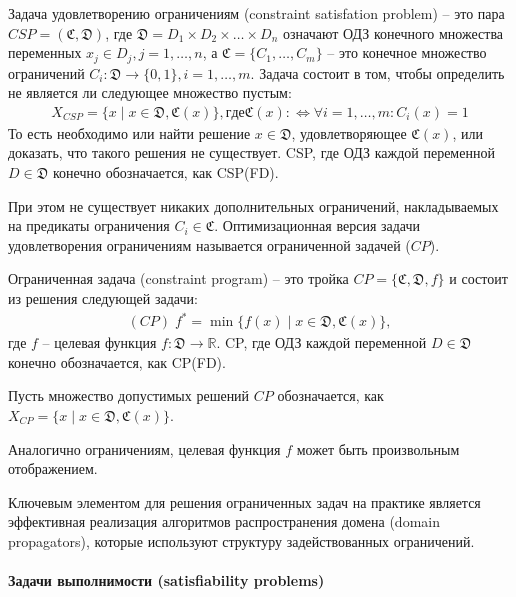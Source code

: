 \documentclass[%
	11pt,
	a4paper,
	utf8,
		]{article}
\begin{document}
\begin{definition}
	Задача удовлетворению ограничениям (constraint satisfation problem) -- это пара $CSP = (\mathfrak{C}, \mathfrak{D})$, где $\mathfrak{D}=D_1\times D_2\times\ldots\times D_n$ означают ОДЗ конечного множества переменных $x_j\in D_j, j=1,\ldots,n$, а $\mathfrak{C}=\{C_1, \ldots, C_m\}$ -- это конечное множество ограничений $C_i:  \mathfrak{D}\rightarrow\{0, 1\}, i=1,\ldots,m$. Задача состоит в том, чтобы определить не является ли следующее множество пустым: 
	\begin{align*}
		X_{CSP}=\{x\mid x\in \mathfrak{D}, \mathfrak{C}(x)\}, где \mathfrak{C}(x):\Leftrightarrow\forall i = 1, \ldots, m: C_i(x) = 1
	\end{align*}
	То есть необходимо или найти решение $x\in \mathfrak{D}$, удовлетворяющее $\mathfrak{C}(x)$, или доказать, что такого решения не существует. CSP, где ОДЗ каждой переменной $D\in\mathfrak{D}$ конечно обозначается, как CSP(FD).
\end{definition}

При этом не существует никаких дополнительных ограничений, накладываемых на предикаты ограничения $C_i\in\mathfrak{C}$. Оптимизационная версия задачи удовлетворения ограничениям называется ограниченной задачей ($CP$).

\begin{definition}
	Ограниченная задача (constraint program) -- это тройка $CP=\{\mathfrak{C}, \mathfrak{D}, f\}$ и состоит из решения следующей задачи:
	\begin{align*}
		(CP)\;f^{*} =\min \{f(x)\mid x\in \mathfrak{D}, \mathfrak{C}(x)\},
	\end{align*}
	где $f$ -- целевая функция $f : \mathfrak{D}\rightarrow \mathbb{R}$. CP, где ОДЗ каждой переменной $D\in\mathfrak{D}$ конечно обозначается, как CP(FD).
\end{definition}

Пусть множество допустимых решений $CP$ обозначается, как $X_{CP} = \{x\mid x\in\mathfrak{D}, \mathfrak{C}(x)\}$. 

Аналогично ограничениям, целевая функция $f$ может быть произвольным отображением.

Ключевым элементом для решения ограниченных задач на практике является эффективная реализация алгоритмов распространения домена (domain propagators), которые используют структуру задействованных ограничений.
 
\paragraph{Задачи выполнимости (satisfiability problems)}
\end{document}
